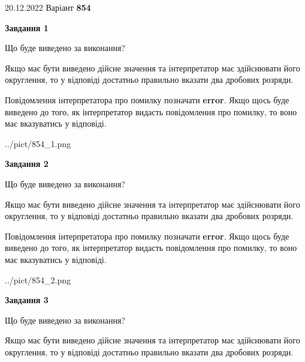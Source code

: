 \documentclass[12pt, ukrainian]{article}
\begin{document}
{20.12.2022 Варіант \No \textbf { 854 }\par}
{
\begin {Large}

{\begin {center}\textbf{Завдання 1}\end {center}}\par
Що буде виведено за виконання? \par

Якщо має бути виведено дійсне значення та інтерпретатор має здійснювати його округлення, 
то у відповіді достатньо правильно вказати два дробових розряди.

Повідомлення інтерпретатора про помилку позначати \textbf{error}.
Якщо щось буде виведено до того, як інтерпретатор видасть повідомлення про помилку, 
то воно має вказуватись у відповіді. \par

\begin{center}
	{../pict/854_1.png}
\end{center}
\newpage

{\begin {center}\textbf{Завдання 2}\end {center}}\par
Що буде виведено за виконання? \par

Якщо має бути виведено дійсне значення та інтерпретатор має здійснювати його округлення, 
то у відповіді достатньо правильно вказати два дробових розряди.

Повідомлення інтерпретатора про помилку позначати \textbf{error}.
Якщо щось буде виведено до того, як інтерпретатор видасть повідомлення про помилку, 
то воно має вказуватись у відповіді. \par

\begin{center}
	{../pict/854_2.png}
\end{center}
\newpage

{\begin {center}\textbf{Завдання 3}\end {center}}\par
Що буде виведено за виконання? \par

Якщо має бути виведено дійсне значення та інтерпретатор має здійснювати його округлення, 
то у відповіді достатньо правильно вказати два дробових розряди.


\end{Large}}
\end{document}
